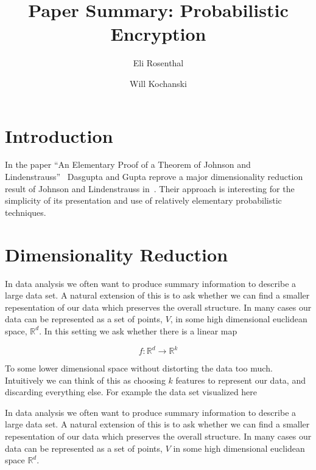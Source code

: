 \documentclass[11pt]{article}
\author{Eli Rosenthal \and Will Kochanski}
\date{}
\title{Paper Summary: Probabilistic Encryption}
\newcommand{\arr}{\rightarrow}
\newcommand{\R}{\mathbb{R}}
\begin{document}
\maketitle
\section{Introduction}
In the paper ``An Elementary Proof of a Theorem of Johnson and
Lindenstrauss''~\cite{mainpaper}  Dasgupta and Gupta reprove a major
dimensionality reduction result of Johnson and Lindenstrauss in~\cite{oldpaper}.
Their approach is interesting for the simplicity of its presentation and use of
relatively elementary probabilistic techniques.

\section{Dimensionality Reduction}

In data analysis we often want to produce summary information to describe a
large data set. A natural extension of this is to ask whether we can find a
smaller repesentation of our data which preserves the overall structure. In many
cases our data can be represented as a set of points, $V$, in some high
dimensional euclidean space, $\R^d$. In this setting we ask whether there is a
linear map

\[ 
  f : \R^d \arr \R^k 
\]

To some lower dimensional space without distorting the data too much.
Intuitively we can think of this as choosing $k$ features to represent our data,
and discarding everything else. For example the data set visualized here

In data analysis we often want to produce summary information to describe a
large data set. A natural extension of this is to ask whether we can find a
smaller repesentation of our data which preserves the overall structure. In many
cases our data can be represented as a set of points, $V$ in some high
dimensional euclidean space $\R^d$.
\end{document}
